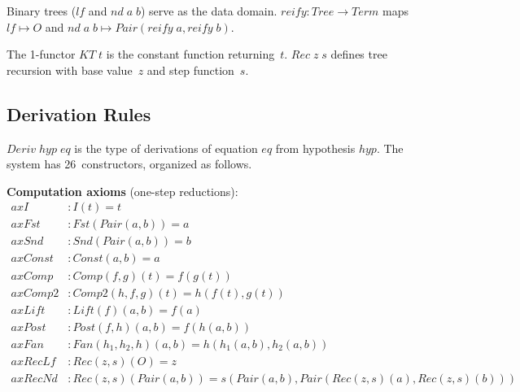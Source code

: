 \documentclass[11pt]{article}
\begin{document}
Binary trees ($\mathit{lf}$ and $\mathit{nd}\;a\;b$) serve as the data
domain. $\mathit{reify} : \mathit{Tree} \to \mathit{Term}$ maps
$\mathit{lf} \mapsto O$ and $\mathit{nd}\;a\;b \mapsto
\mathit{Pair}(\mathit{reify}\;a, \mathit{reify}\;b)$.

The 1-functor $\mathit{KT}\;t$ is the constant function returning~$t$.
$\mathit{Rec}\;z\;s$ defines tree recursion with base value~$z$ and
step function~$s$.

\subsection{Derivation Rules}

$\mathit{Deriv}\;\mathit{hyp}\;\mathit{eq}$ is the type of derivations
of equation $\mathit{eq}$ from hypothesis $\mathit{hyp}$. The system has
26~constructors, organized as follows.

\medskip
\noindent\textbf{Computation axioms} (one-step reductions):
\begin{align}
  \mathit{axI}&: I(t) = t \tag{tag 0}\\
  \mathit{axFst}&: \mathit{Fst}(\mathit{Pair}(a,b)) = a \tag{tag 1}\\
  \mathit{axSnd}&: \mathit{Snd}(\mathit{Pair}(a,b)) = b \tag{tag 2}\\
  \mathit{axConst}&: \mathit{Const}(a,b) = a \tag{tag 3}\\
  \mathit{axComp}&: \mathit{Comp}(f,g)(t) = f(g(t)) \tag{tag 4}\\
  \mathit{axComp2}&: \mathit{Comp2}(h,f,g)(t) = h(f(t), g(t)) \tag{tag 5}\\
  \mathit{axLift}&: \mathit{Lift}(f)(a,b) = f(a) \tag{tag 6}\\
  \mathit{axPost}&: \mathit{Post}(f,h)(a,b) = f(h(a,b)) \tag{tag 7}\\
  \mathit{axFan}&: \mathit{Fan}(h_1,h_2,h)(a,b) = h(h_1(a,b), h_2(a,b)) \tag{tag 8}\\
  \mathit{axRecLf}&: \mathit{Rec}(z,s)(O) = z \tag{tag 9}\\
  \mathit{axRecNd}&: \mathit{Rec}(z,s)(\mathit{Pair}(a,b)) = s(\mathit{Pair}(a,b),
    \mathit{Pair}(\mathit{Rec}(z,s)(a), \mathit{Rec}(z,s)(b))) \tag{tag 10}
\end{align}
\end{document}
